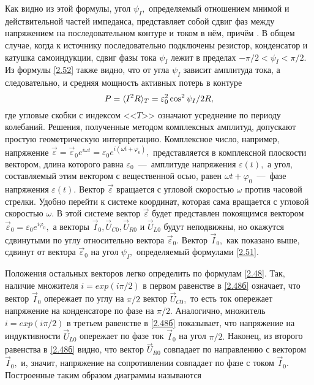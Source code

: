 Как видно из этой формулы, угол $\psi_I,$ определяемый отношением мнимой и действительной частей импеданса, представляет собой сдвиг фаз между напряжением на последовательном контуре и током в нём, причём . В общем случае, когда к источнику последовательно подключены резистор, конденсатор и катушка самоиндукции, сдвиг фазы тока $\psi_I$ лежит в пределах $-\pi/2<\psi_I<\pi/2.$ Из формулы \eqref{2.52} также видно, что от угла $\psi_I$ зависит амплитуда тока, а следовательно, и средняя мощность активных потерь в контуре
\begin{equation}\eqmark{2.53}
	P=\langle I^2R\rangle_T=\varepsilon_0^2\cos^2\psi_I/2R,
\end{equation}
где угловые скобки с индексом <<$T$>> означают усреднение по периоду колебаний.
Решения, полученные методом комплексных амплитуд, допускают простую геометрическую интерпретацию. Комплексное число, например, напряжение $\vec \varepsilon=\vec \varepsilon_0e^{i\omega t}=\varepsilon_0e^{i(\omega t+\varphi_0)},$ представляется в комплексной плоскости вектором, длина которого равна $\varepsilon_0$~---~амплитуде напряжения $\varepsilon(t),$ а угол, составляемый этим вектором с вещественной осью, равен $\omega t+\varphi_0$~---~фазе напряжения $\varepsilon(t).$ Вектор $\vec \varepsilon$ вращается с угловой скоростью $\omega$ против часовой стрелки. Удобно перейти к системе координат, которая сама вращается с угловой скоростью $\omega.$ В этой системе вектор $\vec \varepsilon$ будет представлен покоящимся вектором $\vec \varepsilon_0=\varepsilon_0e^{i\varphi_0},$ а векторы $\vec I_0, \vec U_{C0}, \vec U_{R0}$ и $\vec U_{L0}$ будут неподвижны, но окажутся сдвинутыми по углу относительно вектора $\vec \varepsilon_0.$ Вектор $\vec I_0,$ как показано выше, сдвинут от вектора $\vec \varepsilon_0$ на угол $\psi_I,$ определяемый формулами \eqref{2.51}.

Положения остальных векторов легко определить по формулам \eqref{2.48}. Так, наличие множителя $i=exp(i\pi/2)$ в первом равенстве в \eqref{2.48б} означает, что вектор $\vec I_0$ опережает по углу на $\pi/2$ вектор $\vec U_{C0},$ то есть ток опережает напряжение на конденсаторе по фазе на $\pi/2.$ Аналогично, множитель $i=exp(i\pi/2)$ в третьем равенстве в \eqref{2.48б} показывает, что напряжение на индуктивности $\vec U_{L0}$ опережает по фазе ток $\vec I_0$ на угол $\pi/2.$ Наконец, из второго равенства в \eqref{2.48б} видно, что вектор $\vec U_{R0}$ совпадает по направлению с вектором $\vec I_0,$ и, значит, напряжение на сопротивлении совпадает по фазе с током $\vec I_0$. Построенные таким образом диаграммы называются 

